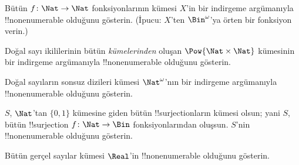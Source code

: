 \documentclass[../../../include/open-logic-section]{subfiles}
\begin{document}
\begin{prob}\label{sfr:siz:red-alt:prob:nat-nat}
  Bütün $f\colon\Nat\to\Nat$ fonksiyonlarının kümesi $X$'in bir indirgeme
  argümanıyla !!{nonenumerable} olduğunu gösterin. (İpucu: $X$'ten
  $\Bin^\omega$'ya örten bir fonksiyon verin.)
\end{prob}

\begin{prob}
Doğal sayı ikililerinin bütün \emph{kümelerinden} oluşan
$\Pow{\Nat\times\Nat}$ kümesinin bir indirgeme argümanıyla !!{nonenumerable}
olduğunu gösterin.
\end{prob}

\begin{prob}
Doğal sayıların sonsuz dizileri kümesi $\Nat^\omega$'nın bir indirgeme
argümanıyla !!{nonenumerable} olduğunu gösterin.
\end{prob}


\begin{prob}
$S$, $\Nat$'tan $\{0,1\}$ kümesine giden bütün !!{surjection}ların kümesi
olsun; yani $S$, bütün !!{surjection} $f\colon\Nat\to\Bin$ fonksiyonlarından
oluşsun. $S$'nin !!{nonenumerable} olduğunu gösterin.
\end{prob}

\begin{prob}
Bütün gerçel sayılar kümesi $\Real$'in !!{nonenumerable} olduğunu gösterin.
\end{prob}
\end{document}
